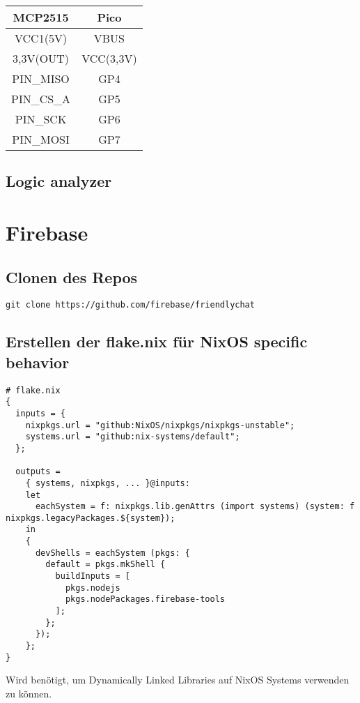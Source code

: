 \begin{tabular}{||c c||} 
  \hline
  MCP2515 & Pico \\ [0.5ex] 
  \hline
  
  \hline
  VCC1(5V) & VBUS \\ 
  \hline
  3,3V(OUT) & VCC(3,3V) \\
  \hline
  PIN\_MISO & GP4 \\
  \hline
  PIN\_CS\_A & GP5 \\
  \hline
  PIN\_SCK & GP6 \\
  \hline
  PIN\_MOSI & GP7 \\
  \hline
\end{tabular}

\subsection{Logic analyzer}




\section{Firebase}

\subsection{Clonen des Repos}
\begin{verbatim}
git clone https://github.com/firebase/friendlychat
\end{verbatim}

\subsection{Erstellen der flake.nix für NixOS specific behavior}
\begin{verbatim}
# flake.nix
{
  inputs = {
    nixpkgs.url = "github:NixOS/nixpkgs/nixpkgs-unstable";
    systems.url = "github:nix-systems/default";
  };

  outputs =
    { systems, nixpkgs, ... }@inputs:
    let
      eachSystem = f: nixpkgs.lib.genAttrs (import systems) (system: f nixpkgs.legacyPackages.${system});
    in
    {
      devShells = eachSystem (pkgs: {
        default = pkgs.mkShell {
          buildInputs = [
            pkgs.nodejs
            pkgs.nodePackages.firebase-tools
          ];
        };
      });
    };
}
\end{verbatim}

Wird benötigt, um Dynamically Linked Libraries auf NixOS Systems verwenden zu können.

